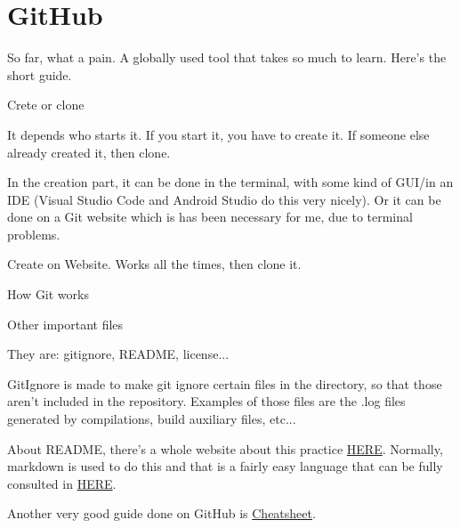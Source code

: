 






\section{GitHub}
\par So far, what a pain. A globally used tool that takes so much to learn. Here's the short guide.

\vspace{.5cm}

{\large Crete or clone}
\vspace{.5cm}
\par It depends who starts it. If you start it, you have to create it. If someone else already created it, then clone.

\par In the creation part, it can be done in the terminal, with some kind of GUI/in an IDE (Visual Studio Code and Android Studio do this very nicely). Or it can be done on a Git website which is has been necessary for me, due to terminal problems.

\par Create on Website. Works all the times, then clone it.
\vspace{.5cm}


{\large How Git works}
\vspace{.5cm}


\vspace{.5cm}

{\large Other important files}

\vspace{.5cm}
\par They are: gitignore, README, license...

\par GitIgnore is made to make git ignore certain files in the directory, so that those aren't included in the repository. Examples of those files are the .log files generated by compilations, build auxiliary files, etc...

\par About README, there's a whole website about this practice \href{https://www.makeareadme.com/}{HERE}. Normally, markdown is used to do this and that is a fairly easy language that can be fully consulted in \href{https://commonmark.org/help/}{HERE}.
\par Another very good guide done on GitHub is \href{https://github.com/adam-p/markdown-here/wiki/Markdown-Cheatsheet}{Cheatsheet}.

